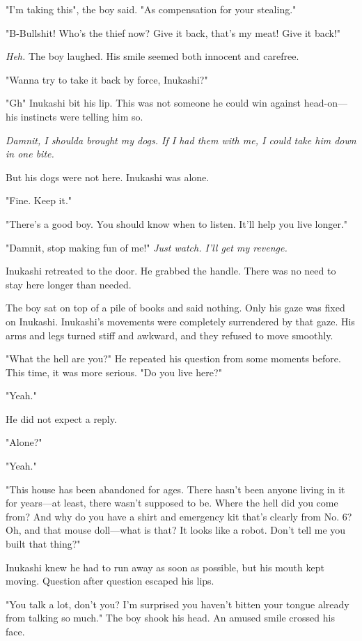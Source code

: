 "I'm taking this", the boy said. "As compensation for your stealing."

"B-Bullshit! Who's the thief now? Give it back, that's my meat! Give it
back!"

\emph{Heh.} The boy laughed. His smile seemed both innocent and carefree.

"Wanna try to take it back by force, Inukashi?"

"Gh\el " Inukashi bit his lip. This was not someone he could win against
head-on---his instincts were telling him so.

\emph{Damnit, I shoulda brought my dogs. If I had them with me, I could take
him down in one bite.}

But his dogs were not here. Inukashi was alone.

"\el Fine. Keep it."

"There's a good boy. You should know when to listen. It'll help you live
longer."

"Damnit, stop making fun of me!" \emph{Just watch. I'll get my revenge.}

Inukashi retreated to the door. He grabbed the handle. There was no need
to stay here longer than needed.

The boy sat on top of a pile of books and said nothing. Only his gaze
was fixed on Inukashi. Inukashi's movements were completely surrendered
by that gaze. His arms and legs turned stiff and awkward, and they
refused to move smoothly.

"\el What the hell are you\el ?" He repeated his question from some
moments before. This time, it was more serious. "Do you live here?"

"Yeah."

He did not expect a reply.

"Alone?"

"Yeah."

"This house has been abandoned for ages. There hasn't been anyone living
in it for years---at least, there wasn't supposed to be. Where the hell
did you come from? And why do you have a shirt and emergency kit that's
clearly from No. 6? Oh, and that mouse doll---what is that? It looks like
a robot. Don't tell me you built that thing?"

Inukashi knew he had to run away as soon as possible, but his mouth kept
moving. Question after question escaped his lips.

"You talk a lot, don't you? I'm surprised you haven't bitten your tongue
already from talking so much." The boy shook his head. An amused smile
crossed his face.

